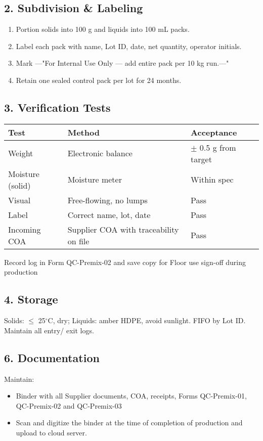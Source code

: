 \subsection*{2. Subdivision \& Labeling}
\begin{enumerate}[leftmargin=*,noitemsep]
  \item Portion solids into 100 g and liquids into 100 mL packs.
  \item Label each pack with name, Lot ID, date, net quantity, operator initials.
  \item Mark ---"For Internal Use Only --- add entire pack per 10 kg run.---"
  \item Retain one sealed control pack per lot for 24 months.
\end{enumerate}

\subsection*{3. Verification Tests}
\begin{tabularx}{\linewidth}{@{}l l X@{}}
\toprule
Test & Method & Acceptance \\
\midrule
Weight & Electronic balance & $\pm$ 0.5 g from target \\
Moisture (solid) & Moisture meter & Within spec \\
Visual & Free-flowing, no lumps & Pass \\
Label & Correct name, lot, date & Pass \\
Incoming COA & Supplier COA with traceability on file & Pass \\
\bottomrule
\end{tabularx}
\item Record log in Form QC-Premix-02 and save  copy for Floor use sign-off during production \\

\subsection*{4. Storage}
Solids: $\leq$ 25$^\circ$C, dry; Liquids: amber HDPE, avoid sunlight. FIFO by Lot ID. Maintain all entry/ exit logs. 

\subsection*{6. Documentation}
Maintain:
\begin{itemize}[noitemsep]
  \item Binder with all Supplier documents, COA, receipts, Forms QC-Premix-01, QC-Premix-02 and QC-Premix-03
  \item Scan and digitize the binder at the time of completion of production and upload to cloud server. 
\end{itemize}


